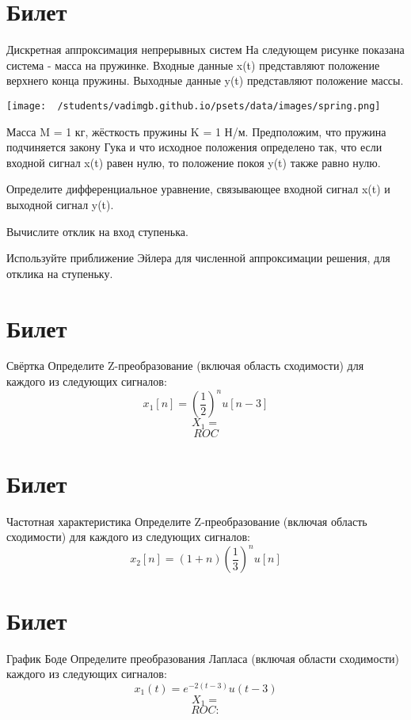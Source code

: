 \documentclass{exam}
\begin{document}
\section{Билет}
\begin{questions}
	\question 
Дискретная аппроксимация непрерывных систем 
	\question 
На следующем рисунке показана система - масса на пружинке.
Входные данные x(t) представляют положение верхнего конца пружины.
Выходные данные y(t) представляют положение массы.

	\texttt{[image: ~/students/vadimgb.github.io/psets/data/images/spring.png]}

Масса M = 1 кг, жёсткость пружины K = 1 Н/м.
Предположим, что пружина подчиняется закону Гука и что исходное 
положения определено так, что если входной сигнал x(t) равен нулю, 
то положение покоя y(t) также равно нулю.


		Определите дифференциальное уравнение, связывающее входной сигнал x(t) и выходной сигнал y(t).  
	
Вычислите отклик на вход ступенька.

Используйте приближение Эйлера для численной аппроксимации решения, 
для отклика на ступеньку.
\end{questions}
\vspace{15pt}

\section{Билет}
\begin{questions}
	\question 
Свёртка 
	\question 
Определите Z-преобразование (включая область сходимости) 
для каждого из следующих сигналов:
	\[
		x_1[n]=\left(\frac{1}{2}\right)^nu[n-3]
	\]
		\[X_1=\]
		\[ROC\]
	
\end{questions}
\vspace{15pt}

\section{Билет}
\begin{questions}
	\question 
Частотная характеристика 
	\question 
Определите Z-преобразование (включая область сходимости) 
для каждого из следующих сигналов:
	\[
		x_2[n]=(1+n)\left(\frac{1}{3}\right)^nu[n]
		\]
\end{questions}
\vspace{15pt}


\section{Билет}
\begin{questions}
	\question 
График Боде 
	\question 
Определите преобразования Лапласа (включая области сходимости) каждого из следующих сигналов:
	\[	
		x_1(t)=e^{-2(t-3)}u(t-3)
		\]
		\[X_1=\]
		\[ROC:\]
\end{questions}
\end{document}

